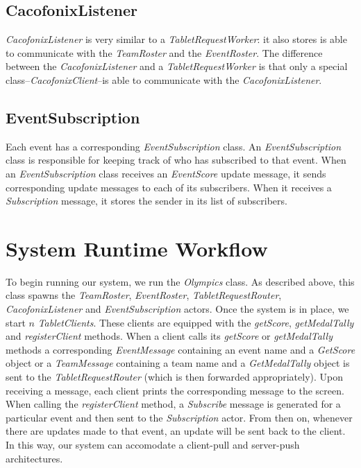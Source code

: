 \documentclass[11pt]{article}
\begin{document}
\subsection{CacofonixListener}
\emph{CacofonixListener} is very similar to a
\emph{TabletRequestWorker}: it also stores is able to communicate with
the \emph{TeamRoster} and the \emph{EventRoster}.  The difference
between the \emph{CacofonixListener} and a \emph{TabletRequestWorker}
is that only a special class--\emph{CacofonixClient}--is able to
communicate with the \emph{CacofonixListener}.

\subsection{EventSubscription}
Each event has a corresponding \emph{EventSubscription} class. An
\emph{EventSubscription} class is responsible for keeping track of who
has subscribed to that event. When an \emph{EventSubscription} class
receives an \emph{EventScore} update message, it sends corresponding
update messages to each of its subscribers.  When it receives a
\emph{Subscription} message, it stores the sender in its list of
subscribers.

\section{System Runtime Workflow}
To begin running our system, we run the \emph{Olympics} class.  As
described above, this class spawns the \emph{TeamRoster},
\emph{EventRoster}, \emph{TabletRequestRouter},
\emph{CacofonixListener} and \emph{EventSubscription} actors.  Once
the system is in place, we start $n$ \emph{TabletClients}.  These
clients are equipped with the \emph{getScore}, \emph{getMedalTally}
and \emph{registerClient} methods. When a client calls its
\emph{getScore} or \emph{getMedalTally} methods a corresponding
\emph{EventMessage} containing an event name and a \emph{GetScore}
object or a \emph{TeamMessage} containing a team name and a
\emph{GetMedalTally} object is sent to the \emph{TabletRequestRouter}
(which is then forwarded appropriately).  Upon receiving a message, each
client prints the corresponding message to the screen.  When calling
the \emph{registerClient} method, a \emph{Subscribe} message is
generated for a particular event and then sent to the
\emph{Subscription} actor.  From then on, whenever there are updates
made to that event, an update will be sent back to the client.  In
this way, our system can accomodate a client-pull and server-push
architectures.
\end{document}
